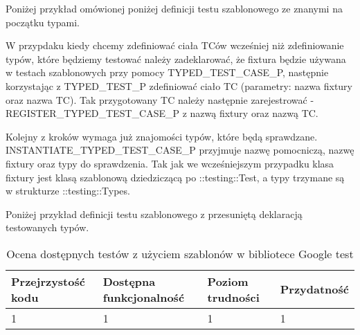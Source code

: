 \documentclass[12pt,a4paper,notitlepage]{report}
\begin{document}
Poniżej przykład omówionej poniżej definicji testu szablonowego ze znanymi na początku typami.

			

W przypdaku kiedy chcemy zdefiniować ciała TCów wcześniej niż zdefiniowanie typów, które będziemy testować należy zadeklarować, że fixtura będzie używana w testach szablonowych przy pomocy TYPED{\_}TEST{\_}CASE{\_}P, następnie korzystając z TYPED{\_}TEST{\_}P zdefiniować ciało TC (parametry: nazwa fixtury oraz nazwa TC). Tak przygotowany TC należy następnie zarejestrować - REGISTER{\_}TYPED{\_}TEST{\_}CASE{\_}P z nazwą fixtury oraz nazwą TC.

Kolejny z kroków wymaga już znajomości typów, które będą sprawdzane. INSTANTIATE{\_}TYPED{\_}TEST{\_}CASE{\_}P przyjmuje nazwę pomocniczą, nazwę fixtury oraz typy do sprawdzenia.
Tak jak we wcześniejszym przypadku klasa fixtury jest klasą szablonową dziedziczącą po ::testing::Test, a typy trzymane są w strukturze ::testing::Types.

Poniżej przykład definicji testu szablonowego z przesuniętą deklaracją testowanych typów.

			

\begin{center}
			\begin{table}[!ht]
			\caption{Ocena dostępnych testów z użyciem szablonów w bibliotece Google test}
			\label{}
			\begin{tabular}[!hc]{|l|l|l|l|}
		\hline
		Przejrzystość kodu 	&	Dostępna funkcjonalność	&	Poziom trudności	&	Przydatność \\ \hline
		1					&	1						&	1					& 	1  			\\ \hline
			\end{tabular}
			\end{table} 
		\end{center}
\end{document}
